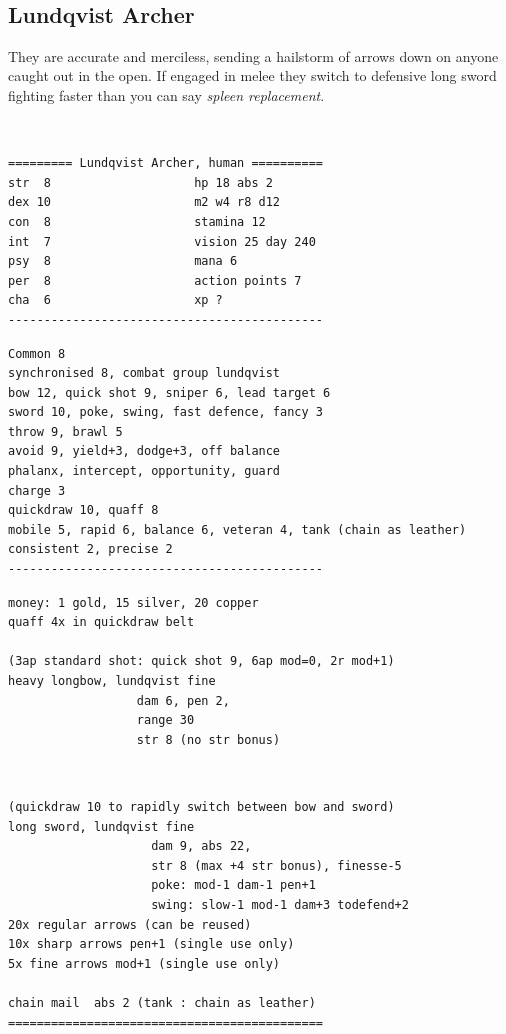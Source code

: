 \


\subsection*{Lundqvist Archer}

They are accurate and merciless, sending a hailstorm of arrows down on anyone caught out in the open. If engaged in melee they switch to defensive long sword fighting faster than you can say \emph{spleen replacement}.

\

\goodbreak \small \begin{samepage} \begin{verbatim}
========= Lundqvist Archer, human ==========
str  8                    hp 18 abs 2
dex 10                    m2 w4 r8 d12
con  8                    stamina 12
int  7                    vision 25 day 240
psy  8                    mana 6
per  8                    action points 7
cha  6                    xp ?
--------------------------------------------
\end{verbatim} \goodbreak \begin{verbatim}
Common 8
synchronised 8, combat group lundqvist
bow 12, quick shot 9, sniper 6, lead target 6
sword 10, poke, swing, fast defence, fancy 3
throw 9, brawl 5
avoid 9, yield+3, dodge+3, off balance
phalanx, intercept, opportunity, guard
charge 3
quickdraw 10, quaff 8
mobile 5, rapid 6, balance 6, veteran 4, tank (chain as leather)
consistent 2, precise 2
--------------------------------------------
\end{verbatim} \goodbreak \begin{verbatim}
money: 1 gold, 15 silver, 20 copper
quaff 4x in quickdraw belt

(3ap standard shot: quick shot 9, 6ap mod=0, 2r mod+1)
heavy longbow, lundqvist fine      
                  dam 6, pen 2,
                  range 30
                  str 8 (no str bonus)
\end{verbatim} \end{samepage}   \   \goodbreak \begin{samepage} \begin{verbatim}
(quickdraw 10 to rapidly switch between bow and sword)
long sword, lundqvist fine
                    dam 9, abs 22,
                    str 8 (max +4 str bonus), finesse-5
                    poke: mod-1 dam-1 pen+1
                    swing: slow-1 mod-1 dam+3 todefend+2
20x regular arrows (can be reused)
10x sharp arrows pen+1 (single use only)
5x fine arrows mod+1 (single use only)

chain mail  abs 2 (tank : chain as leather)
============================================
\end{verbatim} \end{samepage} \normalsize
